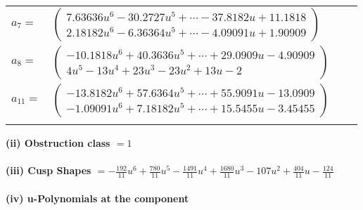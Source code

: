 \documentclass[1p]{elsarticle_modified}
\theoremstyle{definition}
\begin{document}
\begin{tabular}{m{7pt} m{180pt} m{7pt} m{180pt} }
\flushright $a_{7}=$&$\begin{pmatrix}7.63636 u^{6}-30.2727 u^{5}+\cdots-37.8182 u+11.1818\\2.18182 u^{6}-6.36364 u^{5}+\cdots-4.09091 u+1.90909\end{pmatrix}$ \\
\flushright $a_{8}=$&$\begin{pmatrix}-10.1818 u^{6}+40.3636 u^{5}+\cdots+29.0909 u-4.90909\\4 u^5-13 u^4+23 u^3-23 u^2+13 u-2\end{pmatrix}$ \\
\flushright $a_{11}=$&$\begin{pmatrix}-13.8182 u^{6}+57.6364 u^{5}+\cdots+55.9091 u-13.0909\\-1.09091 u^{6}+7.18182 u^{5}+\cdots+15.5455 u-3.45455\end{pmatrix}$\\&\end{tabular}
\flushleft \textbf{(ii) Obstruction class $= 1$}\\~\\
\flushleft \textbf{(iii) Cusp Shapes $= -\frac{192}{11} u^6+\frac{780}{11} u^5-\frac{1491}{11} u^4+\frac{1680}{11} u^3-107 u^2+\frac{404}{11} u-\frac{124}{11}$}\\~\\
\newpage\renewcommand{\arraystretch}{1}
\flushleft \textbf{(iv) u-Polynomials at the component}\newline \\
\end{document}

